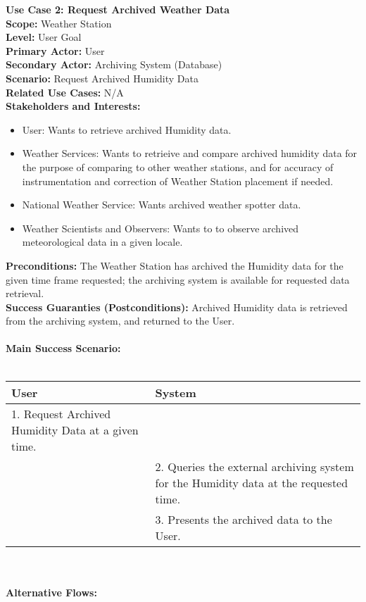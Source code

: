 \documentclass[letterpaper]{article}
\begin{document}
\noindent
\textbf{Use Case 2:  Request Archived Weather Data}\\
\textbf{Scope:  }Weather Station\\
\textbf{Level:  }User Goal\\
\textbf{Primary Actor:  }User\\
\textbf{Secondary Actor:  }Archiving System (Database)\\
\textbf{Scenario:  }Request Archived  Humidity Data\\
\textbf{Related Use Cases:  }N/A\\
\textbf{Stakeholders and Interests:  }
\begin{itemize}
\item User:  Wants to retrieve archived Humidity data.
\item Weather Services:  Wants to retrieive and compare archived
humidity data for the purpose of comparing to other weather
stations, and for accuracy of instrumentation and correction of
Weather Station placement if needed.
\item National Weather Service:  Wants archived weather spotter data.
\item Weather Scientists and Observers:  Wants to to observe archived
meteorological data in a given locale.
\end{itemize}
\textbf{Preconditions:  }The Weather Station has archived the
Humidity data for the given time frame requested; the archiving
system is available for requested data retrieval.\\
\textbf{Success Guaranties (Postconditions):  }Archived Humidity
data is retrieved from the archiving system, and returned to the
User.\\\\
\textbf{Main Success Scenario:  }\\\\
\begin{tabular}{|p{6cm}|p{6cm}|}\hline
\textbf{User} & \textbf{System}\\\hline
1. Request Archived Humidity Data at a given time.&\\\hline
&2.  Queries the external archiving system for the Humidity
data at the requested time.\\\hline
&3.  Presents the archived data to the User.\\\hline
\end{tabular}\\\\
\textbf{Alternative Flows:  }\\
\end{document}
